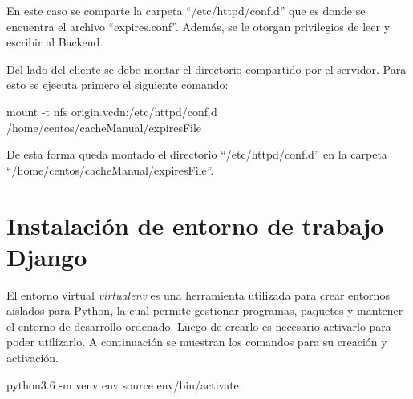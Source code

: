 \documentclass[12pt,a4paper,oneside]{book}
\begin{document}
En este caso se comparte la carpeta ``/etc/httpd/conf.d'' que es donde se encuentra el archivo ``expires.conf''. Además, se le otorgan privilegios de leer y escribir al Backend.

\vspace{0.5cm}

Del lado del cliente se debe montar el directorio compartido por el servidor. Para esto se ejecuta primero el siguiente comando:

\vspace{0.5cm}

\begin{backend}
mount -t nfs origin.vcdn:/etc/httpd/conf.d /home/centos/cacheManual/expiresFile
\end{backend}

\vspace{0.5cm}

De esta forma queda montado el directorio ``/etc/httpd/conf.d'' en la carpeta ``/home/centos/cacheManual/expiresFile''. 

\vspace{0.5cm}




\section{Instalación de entorno de trabajo Django}
\label{seccA.3}

El entorno virtual \textit{virtualenv} es una herramienta utilizada para crear entornos aislados para Python, la cual permite gestionar programas, paquetes y mantener el entorno de desarrollo ordenado.  Luego de crearlo es necesario activarlo para poder utilizarlo.
A continuación se muestran los comandos para su creación y activación.

\vspace{0.5cm}
\begin{frontend}
 python3.6 -m venv env
 source env/bin/activate
\end{frontend}
\vspace{0.5cm}
\end{document}
